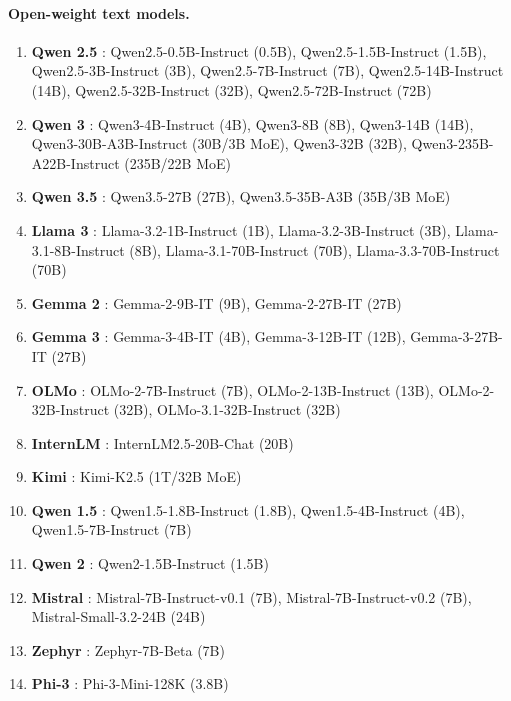 \paragraph{Open-weight text models.}
\begin{enumerate}
    \item \textbf{Qwen 2.5} \citep{Yang2024Qwen25TR}: Qwen2.5-0.5B-Instruct (0.5B), Qwen2.5-1.5B-Instruct (1.5B), Qwen2.5-3B-Instruct (3B), Qwen2.5-7B-Instruct (7B), Qwen2.5-14B-Instruct (14B), Qwen2.5-32B-Instruct (32B), Qwen2.5-72B-Instruct (72B)
    \item \textbf{Qwen 3} \citep{yang2025qwen3}: Qwen3-4B-Instruct (4B), Qwen3-8B (8B), Qwen3-14B (14B), Qwen3-30B-A3B-Instruct (30B/3B MoE), Qwen3-32B (32B), Qwen3-235B-A22B-Instruct (235B/22B MoE)
    \item \textbf{Qwen 3.5} \citep{yang2025qwen3}: Qwen3.5-27B (27B), Qwen3.5-35B-A3B (35B/3B MoE)
    \item \textbf{Llama 3} \citep{grattafiori2024llama}: Llama-3.2-1B-Instruct (1B), Llama-3.2-3B-Instruct (3B), Llama-3.1-8B-Instruct (8B), Llama-3.1-70B-Instruct (70B), Llama-3.3-70B-Instruct (70B)
    \item \textbf{Gemma 2} \citep{team2024gemma}: Gemma-2-9B-IT (9B), Gemma-2-27B-IT (27B)
    \item \textbf{Gemma 3} \citep{Kamath2025Gemma3T}: Gemma-3-4B-IT (4B), Gemma-3-12B-IT (12B), Gemma-3-27B-IT (27B)
    \item \textbf{OLMo} \citep{olmo20242, olmo2025olmo}: OLMo-2-7B-Instruct (7B), OLMo-2-13B-Instruct (13B), OLMo-2-32B-Instruct (32B), OLMo-3.1-32B-Instruct (32B)
    \item \textbf{InternLM} \citep{cai2024internlm2}: InternLM2.5-20B-Chat (20B)
    \item \textbf{Kimi} \citep{team2026kimi}: Kimi-K2.5 (1T/32B MoE)
    \item \textbf{Qwen 1.5} \citep{bai2023qwen}: Qwen1.5-1.8B-Instruct (1.8B), Qwen1.5-4B-Instruct (4B), Qwen1.5-7B-Instruct (7B)
    \item \textbf{Qwen 2} \citep{yang2024qwen2}: Qwen2-1.5B-Instruct (1.5B)
    \item \textbf{Mistral} \citep{jiang2023mistral}: Mistral-7B-Instruct-v0.1 (7B), Mistral-7B-Instruct-v0.2 (7B), Mistral-Small-3.2-24B (24B)
    \item \textbf{Zephyr} \citep{tunstall2023zephyr}: Zephyr-7B-Beta (7B)
    \item \textbf{Phi-3} \citep{abdin2024phi}: Phi-3-Mini-128K (3.8B)
\end{enumerate}

